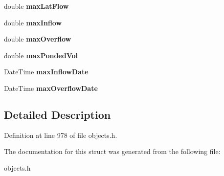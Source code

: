 \begin{DoxyCompactItemize}
double {\bfseries max\+Lat\+Flow}
\item 
\mbox{\label{struct_t_node_stats_aae1104a632da02fe4903627b4a5d6d8c}} 
double {\bfseries max\+Inflow}
\item 
\mbox{\label{struct_t_node_stats_a7e88e056369900161916d4d7d30b0686}} 
double {\bfseries max\+Overflow}
\item 
\mbox{\label{struct_t_node_stats_a54c91cb8b257cd284fe7ee420760416e}} 
double {\bfseries max\+Ponded\+Vol}
\item 
\mbox{\label{struct_t_node_stats_a2dcee677fa53f2c0651b83a432aa7f6d}} 
Date\+Time {\bfseries max\+Inflow\+Date}
\item 
\mbox{\label{struct_t_node_stats_ae620d9fb9fa3fb31c14f3eccaa0b5c3e}} 
Date\+Time {\bfseries max\+Overflow\+Date}
\end{DoxyCompactItemize}


\subsection{Detailed Description}


Definition at line 978 of file objects.\+h.



The documentation for this struct was generated from the following file\+:\begin{DoxyCompactItemize}
\item 
objects.\+h\end{DoxyCompactItemize}

